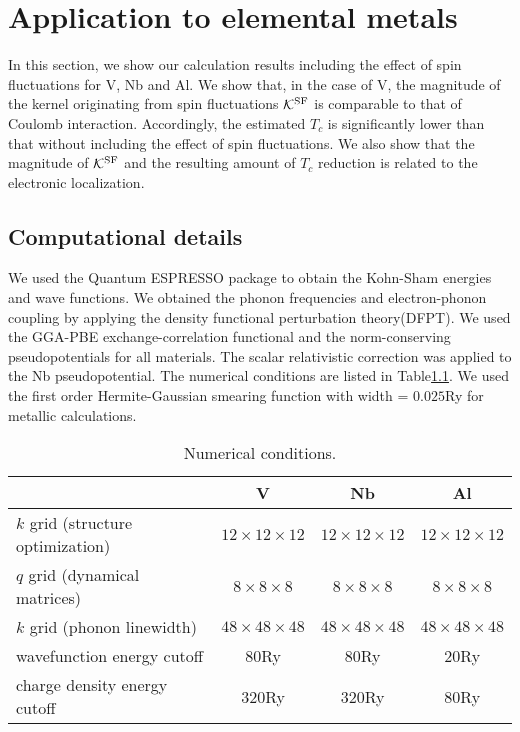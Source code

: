 

%
%
\chapter{Application to elemental metals}
\label{application}
In this section, we show our calculation results including the effect of spin fluctuations 
for V, Nb and Al. We show that, in the case of V, the magnitude of the kernel originating 
from spin fluctuations $\mathcal K^{\rm SF}$ is comparable to that of Coulomb interaction.
Accordingly, the estimated $T_{c}$ is significantly lower than that without including the
effect of spin fluctuations. We also show that the magnitude of $\mathcal K^{\rm SF}$ and the 
resulting amount of $T_{c}$ reduction is related to the electronic localization.

\section{Computational details}
We used the Quantum ESPRESSO package\cite{QE} to obtain the Kohn-Sham energies and wave functions.
We obtained the phonon frequencies and electron-phonon coupling by applying the density functional
perturbation theory(DFPT)\cite{DFPT}.
We used the GGA-PBE exchange-correlation functional\cite{GGAPBE} and the norm-conserving 
pseudopotentials\cite{normcons} for all materials. 
The scalar relativistic correction was applied to the Nb pseudopotential.
The numerical conditions are listed in Table\ref{tab:numcond}.
We used the first order Hermite-Gaussian smearing function\cite{Paxton1989} 
with width = $0.025$Ry for metallic calculations.

\begin{table}[hbtp]
	\centering
	\caption{Numerical conditions.}
	\begin{tabular}{lccc}
		\hline \hline
		& V & Nb & Al \\
		\hline
	$k$ grid (structure optimization) & $12\times12\times12$ & $12\times12\times12$ & $12\times12\times12$ \\
	$q$ grid (dynamical matrices) & $ 8\times8\times8$ & $8\times8\times8$ & $8\times8\times8$ \\
	$k$ grid (phonon linewidth) & $48\times48\times48$ & $48\times48\times48$ & $48\times48\times48$ \\
	wavefunction energy cutoff & 80Ry & 80Ry & 20Ry \\
	charge density energy cutoff & 320Ry & 320Ry & 80Ry \\
	\hline \hline
	\end{tabular}
	\label{tab:numcond}
\end{table}

